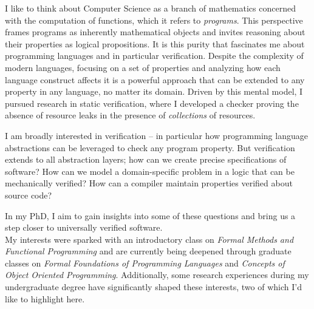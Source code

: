 \documentclass{article}
\begin{document}
I like to think about Computer Science as a branch of mathematics concerned with the computation of functions, which it refers to \emph{programs}. This perspective frames programs as inherently mathematical objects and invites reasoning about their properties as logical propositions. It is this purity that fascinates me about programming languages and in particular verification. Despite the complexity of modern languages, focusing on a set of properties and analyzing how each language construct affects it is a powerful approach that can be extended to any property in any language, no matter its domain. Driven by this mental model, I pursued research in static verification, where I developed a checker proving the absence of resource leaks in the presence of \emph{collections} of resources.

I am broadly interested in verification -- in particular how programming language abstractions can be leveraged to check any program property. But verification extends to all abstraction layers; how can we create precise specifications of software? How can we model a domain-specific problem in a logic that can be mechanically verified? How can a compiler maintain properties verified about source code?

In my PhD, I aim to gain insights into some of these questions and bring us a step closer to universally verified software.\\

My interests were sparked with an introductory class on \emph{Formal Methods and Functional Programming} and are currently being deepened through graduate classes on \emph{Formal Foundations of Programming Languages} and \emph{Concepts of Object Oriented Programming}. Additionally, some research experiences during my undergraduate degree have significantly shaped these interests, two of which I'd like to highlight here.\\
\end{document}
